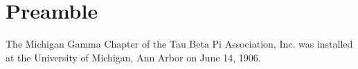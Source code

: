 \documentclass[constitution,final,withoutpreface,withoutoptional,11pt]{../bylaws}
\begin{document}
\newenvironment{tight_enumerate}{
  \vspace{2mm}
\begin{compactenum}[1.]
  \setlength{\itemindent}{+1.20em}
  \setlength{\itemsep}{5pt}
  \setlength{\parskip}{2pt}
}{\end{compactenum}
  \vspace{3mm}
}


\frontmatter
\maketitle
\setcounter{tocdepth}{0}
\tableofcontents
\newpage
\mainmatter
\chapter*{Preamble}
The Michigan Gamma Chapter of the Tau Beta Pi Association, Inc. was installed at the University of Michigan, Ann Arbor on June 14, 1906.








\end{document}
